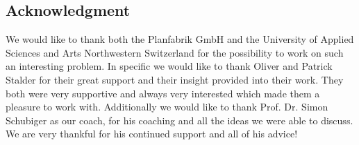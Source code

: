 \subsection{Acknowledgment}
We would like to thank both the Planfabrik GmbH and the University of Applied Sciences and Arts Northwestern Switzerland for the possibility to work on such an interesting problem. In specific we would like to thank Oliver and Patrick Stalder for their great support and their insight provided into their work. They both were very supportive and always very interested which made them a pleasure to work with. Additionally we would like to thank Prof. Dr. Simon Schubiger as our coach, for his coaching and all the ideas we were able to discuss. We are very thankful for his continued support and all of his advice!